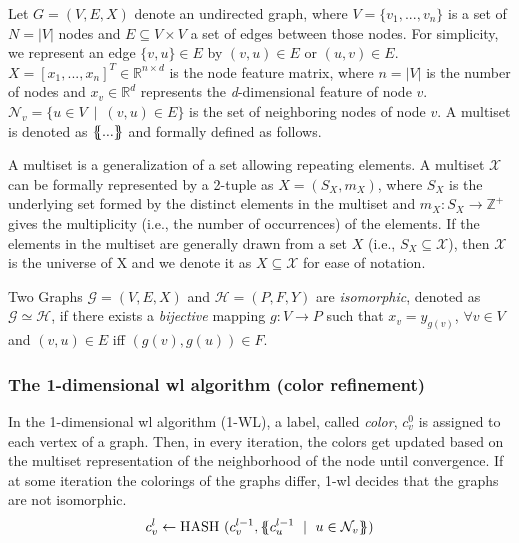 Let $G = (V,E, X)$ denote an undirected graph, where $V =\{v_{1},...,v_{n}\}$ is a set of $ N = |V|$ nodes and $E \subseteq V\times V $ a set of edges between those nodes. For simplicity, we represent an edge $\{v,u\} \in E$ by $(v,u) \in E$ or $(u,v)\in E$. $X= [x_{1},...,x_{n}]^{T} \in \mathbb{R}^{n \times d}$ is the node feature matrix, where $n = |V|$ is the number of nodes and $x_{v} \in \mathbb{R}^{d}$ represents the \textit{d}-dimensional feature of node $v$. $\mathcal{N}_{v}= \{u \in V\ \mid \ (v,u) \in E\}$ is the set of neighboring nodes of node $v$. A multiset is denoted
as $\ldblbrace...\rdblbrace$ and formally defined as follows.
\begin{defn}[Multiset]
    A multiset is a generalization of a set allowing repeating elements. A multiset $\mathcal{X}$ can be formally represented by a 2-tuple as $X = (S_{X}, m_{X})$, where $S_{X}$ is the
    underlying set formed by the distinct elements in the multiset and $m_{X}:S_{X} \rightarrow
        \mathbb{Z}^{+}$ gives the multiplicity (i.e., the number of occurrences) of the elements.
    If the elements in the multiset are generally drawn from a set $X$ (i.e., $S_{X} \subseteq \mathcal{X}$), then $\mathcal{X}$ is the universe of X and we denote it as $X \subseteq \mathcal{X}$ for ease of notation.
\end{defn}
\begin{defn}[Isomorphism]
    Two Graphs $\mathcal{G}= (V,E,X)$ and $\mathcal{H}= (P,F,Y)$ are \textit{isomorphic}, denoted as $\mathcal{G} \simeq \mathcal{H}$, if there exists a \textit{bijective} mapping $g: V \rightarrow P$ such that $x_{v}= y_{g(v)}$, $\forall v \in V$ and $(v,u) \in E$ iff $(g(v),g(u)) \in F$.
\end{defn}
\subsubsection{The 1-dimensional \acs{wl} algorithm (color refinement)}
In the 1-dimensional \ac{wl} algorithm (1-WL), a label, called \emph{color}, $c_{v}^{0}$ is assigned to each vertex of a graph. Then, in every iteration, the colors get updated based on the multiset representation of the neighborhood of the node until convergence. If at some iteration the colorings of the graphs differ, 1-\ac{wl} decides that the graphs are not isomorphic.
\begin{align*}
    c_{v}^{l} \leftarrow \mathrm{HASH}\ (c_{v}^{l-1}, \ldblbrace c_{u}^{l-1}\ \mid \ u \in \mathcal{N}_{v} \rdblbrace)
\end{align*}
\\

